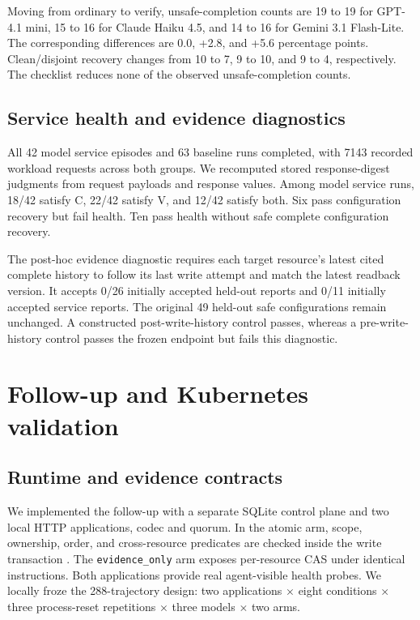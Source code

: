 \documentclass[conference,10pt]{IEEEtran}
\begin{document}
Moving from ordinary to verify, unsafe\hyp{}completion counts are 19 to 19 for GPT-4.1 mini, 15 to 16 for Claude Haiku 4.5, and 14 to 16 for Gemini 3.1 Flash\hyp{}Lite. The corresponding differences are 0.0, +2.8, and +5.6 percentage points. Clean/disjoint recovery changes from 10 to 7, 9 to 10, and 9 to 4, respectively. The checklist reduces none of the observed unsafe\hyp{}completion counts.

\subsection{Service health and evidence diagnostics}

All 42 model service episodes and 63 baseline runs completed, with 7143 recorded workload requests across both groups. We recomputed stored response\hyp{}digest judgments from request payloads and response values. Among model service runs, 18/42 satisfy C, 22/42 satisfy V, and 12/42 satisfy both. Six pass configuration recovery but fail health. Ten pass health without safe complete configuration recovery.

The post\hyp{}hoc evidence diagnostic requires each target resource's latest cited complete history to follow its last write attempt and match the latest readback version. It accepts 0/26 initially accepted held\hyp{}out reports and 0/11 initially accepted service reports. The original 49 held\hyp{}out safe configurations remain unchanged. A constructed post\hyp{}write\hyp{}history control passes, whereas a pre\hyp{}write\hyp{}history control passes the frozen endpoint but fails this diagnostic.

\section{Follow-up and Kubernetes validation}

\subsection{Runtime and evidence contracts}

We implemented the follow\hyp{}up with a separate SQLite control plane and two local HTTP applications, codec and quorum. In the atomic arm, scope, ownership, order, and cross\hyp{}resource predicates are checked inside the write transaction \cite{ref12}. The \texttt{\mbox{evidence\_}\discretionary{}{}{}\mbox{only}} arm exposes per\hyp{}resource CAS under identical instructions. Both applications provide real agent\hyp{}visible health probes. We locally froze the 288-trajectory design: two applications $\times$ eight conditions $\times$ three process\hyp{}reset repetitions $\times$ three models $\times$ two arms.
\end{document}
